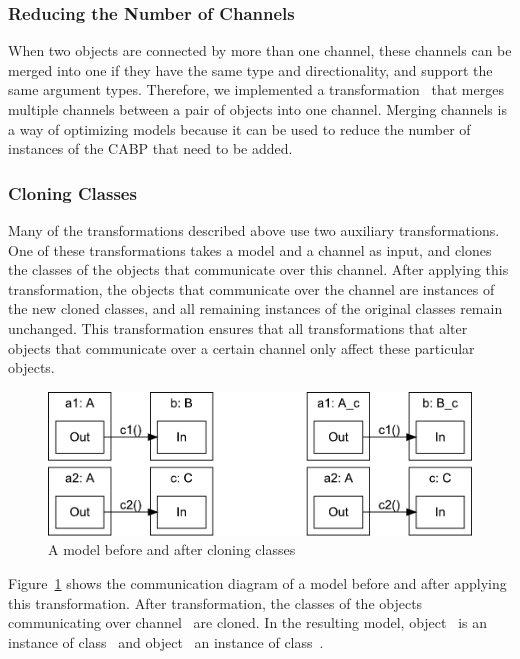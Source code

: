 \subsubsection{Reducing the Number of Channels}
When two objects are connected by more than one channel, these channels can be merged into one if they have the same type and directionality, and support the same argument types.
Therefore, we implemented a transformation~ that merges multiple channels between a pair of objects into one channel.
Merging channels is a way of optimizing models because it can be used to reduce the number of instances of the CABP that need to be added.

\subsubsection{Cloning Classes}
Many of the transformations described above use two auxiliary transformations.
One of these transformations takes a model and a channel as input, and clones the classes of the objects that communicate over this channel.
After applying this transformation, the objects that communicate over the channel are instances of the new cloned classes, and all remaining instances of the original classes remain unchanged.
This transformation ensures that all transformations that alter objects that communicate over a certain channel only affect these particular objects.

\begin{figure}[hbt]
  \centering
  \includegraphics[scale=0.45]{slco/figs/transformations/CloneClasses}
  \caption{A model before and after cloning classes}
  \label{fig:slco:clone}
\end{figure}

Figure~\ref{fig:slco:clone} shows the communication diagram of a model before and after applying this transformation.
After transformation, the classes of the objects communicating over channel~ are cloned.
In the resulting model, object~ is an instance of class~ and object~ an instance of class~.


